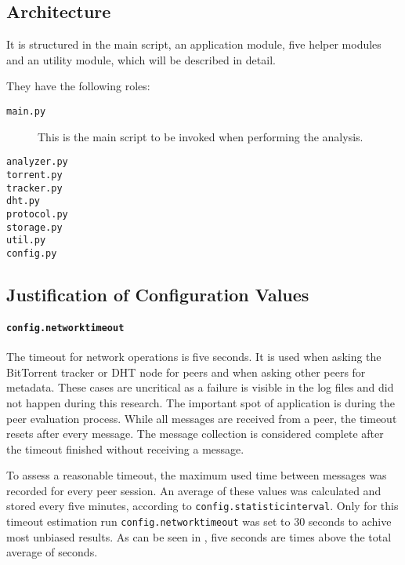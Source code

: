 \documentclass[10pt, a4paper]{scrartcl} %
\renewcommand{\_}{\origunderscore\allowbreak}
\newcommand{\config}[1]{\texttt{config.\allowbreak #1}}
\begin{document}
\subsection{Architecture}
It is structured in the main script, an application module, five helper modules and an utility module, which will be described in detail.

They have the following roles:

\begin{description}
  \item[\texttt{main.py}] This is the main script to be invoked when performing the analysis.
  \item[\texttt{analyzer.py}]
  \item[\texttt{torrent.py}]
  \item[\texttt{tracker.py}]
  \item[\texttt{dht.py}]
  \item[\texttt{protocol.py}]
  \item[\texttt{storage.py}]
  \item[\texttt{util.py}]
  \item[\texttt{config.py}]
\end{description}

\subsection{Justification of Configuration Values}
\paragraph{\config{network\_timeout}}
The timeout for network operations is five seconds. It is used when asking the BitTorrent tracker or DHT node for peers and when asking other peers for metadata. These cases are uncritical as a failure is visible in the log files and did not happen during this research. The important spot of application is during the peer evaluation process. While all messages are received from a peer, the timeout resets after every message. The message collection is considered complete after the timeout finished without receiving a message.

To assess a reasonable timeout, the maximum used time between messages was recorded for every peer session. An average of these values was calculated and stored every five minutes, according to \config{statistic\_interval}. Only for this timeout estimation run \config{network\_timeout} was set to 30 seconds to achive most unbiased results. As can be seen in \cite{timeout-test}, five seconds are \_ times above the total average of \_ seconds.
\end{document}
